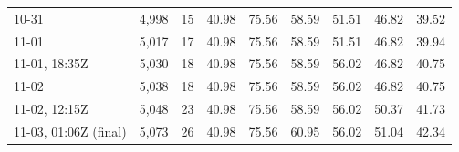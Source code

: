 \begin{table}[!htb]
\begin{tabular}{@{}lrrrrrrrr@{}}
10-31 & 4,998 & 15 & 40.98 & 75.56 & 58.59 & 51.51 & 46.82 & 39.52 \\
11-01 & 5,017 & 17 & 40.98 & 75.56 & 58.59 & 51.51 & 46.82 & 39.94 \\
11-01, 18:35Z & 5,030 & 18 & 40.98 & 75.56 & 58.59 & 56.02 & 46.82 & 40.75 \\
11-02 & 5,038 & 18 & 40.98 & 75.56 & 58.59 & 56.02 & 46.82 & 40.75 \\
11-02, 12:15Z & 5,048 & 23 & 40.98 & 75.56 & 58.59 & 56.02 & 50.37 & 41.73 \\
11-03, 01:06Z (final) & 5,073 & 26 & 40.98 & 75.56 & 60.95 & 56.02 & 51.04 & 42.34 \\
\bottomrule
\end{tabular}
\end{table}
\fi

